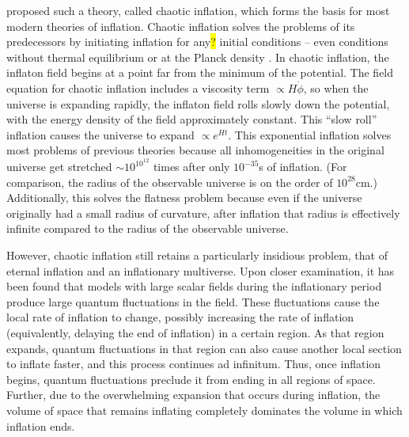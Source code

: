 \documentclass[a4paper,11pt]{article}
\newcommand{\hl}[1]{\colorbox{yellow}{#1}}
\begin{document}
\citet{Linde1983} proposed such a theory, called chaotic inflation, which forms the basis for most modern theories of inflation. Chaotic inflation solves the problems of its predecessors by initiating inflation for any\hl{?} initial conditions -- even conditions without thermal equilibrium or at the Planck density \citep{LindeBook2005}. In chaotic inflation, the inflaton field begins at a point far from the minimum of the potential. The field equation for chaotic inflation includes a viscosity term $\propto H \dot \phi$, so when the universe is expanding rapidly, the inflaton field rolls slowly down the potential, with the energy density of the field approximately constant. This ``slow roll'' inflation causes the universe to expand $\propto e^{Ht}$. This exponential inflation solves most problems of previous theories because all inhomogeneities in the original universe get stretched $\sim 10^{10^{12}}$ times after only $10^{-35}$s of inflation. (For comparison, the radius of the observable universe is on the order of $10^{28}$cm.) Additionally, this solves the flatness problem because even if the universe originally had a small radius of curvature, after inflation that radius is effectively infinite compared to the radius of the observable universe. \citep{Linde2000} 

However, chaotic inflation still retains a particularly insidious problem, that of eternal inflation and an inflationary multiverse. Upon closer examination, it has been found that models with large scalar fields during the inflationary period produce large quantum fluctuations in the field. These fluctuations cause the local rate of inflation to change, possibly increasing the rate of inflation (equivalently, delaying the end of inflation) in a certain region. As that region expands, quantum fluctuations in that region can also cause another local section to inflate faster, and this process continues ad infinitum. Thus, once inflation begins, quantum fluctuations preclude it from ending in all regions of space. Further, due to the overwhelming expansion that occurs during inflation, the volume of space that remains inflating completely dominates the volume in which inflation ends.
\end{document}
